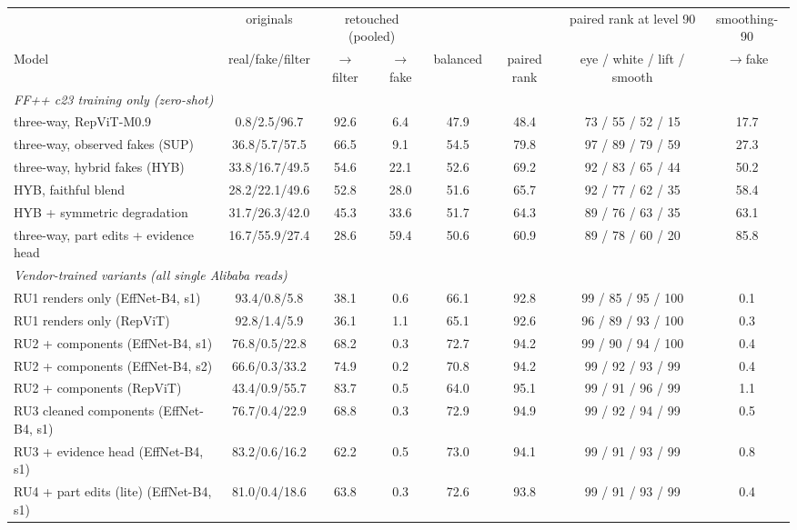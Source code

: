 \begin{tabular}{l c cc c c c c}
\toprule
 & originals & \multicolumn{2}{c}{retouched (pooled)} & & & paired rank at level 90 & smoothing-90 \\
\cmidrule(lr){3-4}
Model & real/fake/filter & $\to$filter & $\to$fake & balanced & paired rank & eye / white / lift / smooth & $\to$fake \\
\midrule
\multicolumn{8}{l}{\textit{FF++ c23 training only (zero-shot)}} \\
three-way, RepViT-M0.9 & 0.8/2.5/96.7 & 92.6 & 6.4 & 47.9 & 48.4 & 73 / 55 / 52 / 15 & 17.7 \\
three-way, observed fakes (SUP) & 36.8/5.7/57.5 & 66.5 & 9.1 & 54.5 & 79.8 & 97 / 89 / 79 / 59 & 27.3 \\
three-way, hybrid fakes (HYB) & 33.8/16.7/49.5 & 54.6 & 22.1 & 52.6 & 69.2 & 92 / 83 / 65 / 44 & 50.2 \\
HYB, faithful blend & 28.2/22.1/49.6 & 52.8 & 28.0 & 51.6 & 65.7 & 92 / 77 / 62 / 35 & 58.4 \\
HYB + symmetric degradation & 31.7/26.3/42.0 & 45.3 & 33.6 & 51.7 & 64.3 & 89 / 76 / 63 / 35 & 63.1 \\
three-way, part edits + evidence head & 16.7/55.9/27.4 & 28.6 & 59.4 & 50.6 & 60.9 & 89 / 78 / 60 / 20 & 85.8 \\
\midrule
\multicolumn{8}{l}{\textit{Vendor-trained variants (all single Alibaba reads)}} \\
RU1 renders only (EffNet-B4, s1) & 93.4/0.8/5.8 & 38.1 & 0.6 & 66.1 & 92.8 & 99 / 85 / 95 / 100 & 0.1 \\
RU1 renders only (RepViT) & 92.8/1.4/5.9 & 36.1 & 1.1 & 65.1 & 92.6 & 96 / 89 / 93 / 100 & 0.3 \\
RU2 + components (EffNet-B4, s1) & 76.8/0.5/22.8 & 68.2 & 0.3 & 72.7 & 94.2 & 99 / 90 / 94 / 100 & 0.4 \\
RU2 + components (EffNet-B4, s2) & 66.6/0.3/33.2 & 74.9 & 0.2 & 70.8 & 94.2 & 99 / 92 / 93 / 99 & 0.4 \\
RU2 + components (RepViT) & 43.4/0.9/55.7 & 83.7 & 0.5 & 64.0 & 95.1 & 99 / 91 / 96 / 99 & 1.1 \\
RU3 cleaned components (EffNet-B4, s1) & 76.7/0.4/22.9 & 68.8 & 0.3 & 72.9 & 94.9 & 99 / 92 / 94 / 99 & 0.5 \\
RU3 + evidence head (EffNet-B4, s1) & 83.2/0.6/16.2 & 62.2 & 0.5 & 73.0 & 94.1 & 99 / 91 / 93 / 99 & 0.8 \\
RU4 + part edits (lite) (EffNet-B4, s1) & 81.0/0.4/18.6 & 63.8 & 0.3 & 72.6 & 93.8 & 99 / 91 / 93 / 99 & 0.4 \\

\end{tabular}

